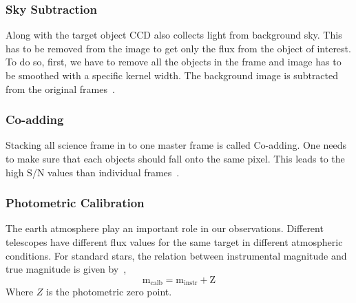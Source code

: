 \subsubsection{Sky Subtraction}
Along with the target object CCD also collects light from background sky. This has to be removed from the image to get only the flux from the object of interest. To do so, first, we have to remove all the objects in the frame and image has to be smoothed with a specific kernel width. The background image is subtracted from the original frames~\cite{manual}.
\subsubsection{Co-adding}
Stacking all science frame in to one master frame is called Co-adding. One needs to make sure that each objects should fall onto the same pixel. This leads to the high S/N values than individual frames~\cite{manual}.
\subsubsection{Photometric Calibration}
The earth atmosphere play an important role in our observations. Different telescopes have different flux values for the same target in different atmospheric conditions. For standard stars, the relation between instrumental magnitude and true magnitude is given by~\cite{manual},
\begin{equation}
\text{m}_{\text{calb}}=\text{m}_{\text{instr}}+ \text{Z}
\end{equation}
Where $Z$ is the photometric zero point.
